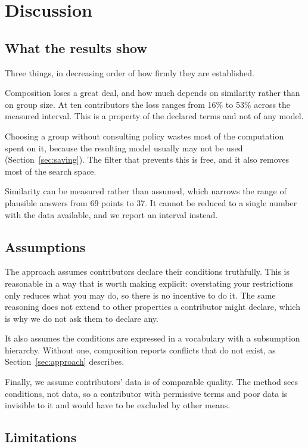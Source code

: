 \documentclass[sigconf,anonymous,review]{acmart}
\begin{document}
\section{Discussion}

\subsection{What the results show}

Three things, in decreasing order of how firmly they are established.

Composition loses a great deal, and how much depends on similarity rather than on
group size. At ten contributors the loss ranges from 16\% to 53\% across the
measured interval. This is a property of the declared terms and not of any model.

Choosing a group without consulting policy wastes most of the computation spent on
it, because the resulting model usually may not be used
(Section~\ref{sec:saving}). The filter that prevents
this is free, and it also removes most of the search space.

Similarity can be measured rather than assumed, which narrows the range of
plausible answers from 69 points to 37. It cannot be reduced to a single number
with the data available, and we report an interval instead.

\subsection{Assumptions}

The approach assumes contributors declare their conditions truthfully. This is
reasonable in a way that is worth making explicit: overstating your restrictions
only reduces what you may do, so there is no incentive to do it. The same
reasoning does not extend to other properties a contributor might declare, which
is why we do not ask them to declare any.

It also assumes the conditions are expressed in a vocabulary with a subsumption
hierarchy. Without one, composition reports conflicts that do not exist, as
Section~\ref{sec:approach} describes.

Finally, we assume contributors' data is of comparable quality. The method sees
conditions, not data, so a contributor with permissive terms and poor data is
invisible to it and would have to be excluded by other means.

\subsection{Limitations}
\end{document}
